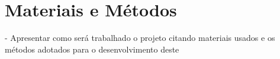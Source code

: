 \chapter{Materiais e Métodos}\label{cap:materiais_metodos}

- Apresentar como será trabalhado o projeto citando materiais usados e os métodos adotados para o desenvolvimento deste